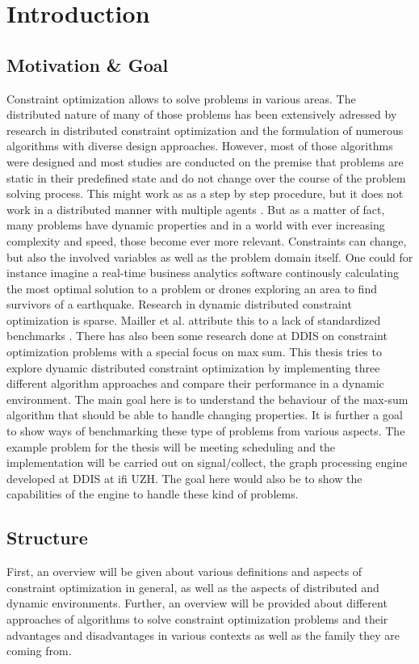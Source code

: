 \chapter{Introduction}

\section{Motivation \& Goal}
Constraint optimization allows to solve problems in various areas. The distributed nature of  many of those problems has been extensively adressed by research in distributed constraint optimization and the formulation of numerous algorithms with diverse design approaches. However, most of those algorithms were designed and most studies are conducted on the premise that problems are static in their predefined state and do not change over the course of the problem solving process. This might work as as a step by step procedure, but it does not work in a distributed manner with multiple agents \cite{Petcu2007}. But as a matter of fact, many problems have dynamic properties and in a world with ever increasing complexity and speed, those become ever more relevant. Constraints can change, but also the involved variables as well as the problem domain itself. One could for instance imagine a real-time business analytics software continously calculating the most optimal solution to a problem or drones exploring an area to find survivors of a earthquake. Research in dynamic distributed constraint optimization is sparse. Mailler et al. attribute this to a lack of standardized benchmarks \cite{Mailler2014}. There has also been some research done at DDIS on constraint optimization problems with a special focus on max sum.
\newline \newline
This thesis tries to explore dynamic distributed constraint optimization by implementing three different algorithm approaches and compare their performance in a dynamic environment. The main goal here is to understand the behaviour of the max-sum algorithm that should be able to handle changing properties. It is further a goal to show ways of benchmarking these type of problems from various aspects. The example problem for the thesis will be meeting scheduling and the implementation will be carried out on signal/collect, the graph processing engine developed at  DDIS at ifi UZH. The goal here would also be to show the capabilities of the engine to handle these kind of problems.

\section{Structure}
First, an overview will be given about various definitions and aspects of constraint optimization in general, as well as the aspects of  distributed and dynamic environments. Further, an overview will be provided about different approaches of algorithms to solve constraint optimization problems and their advantages and disadvantages in various contexts as well as the family they are coming from. 

